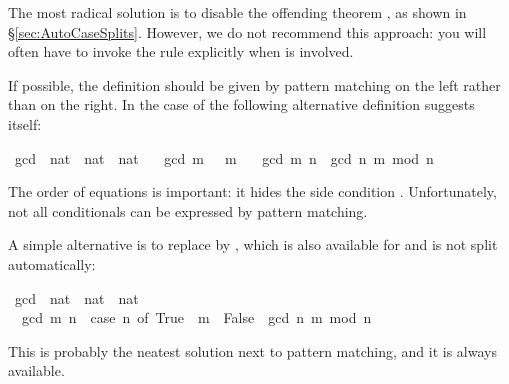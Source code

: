 \begin{isabellebody}
\begin{isamarkuptext}
The most radical solution is to disable the offending theorem
,
as shown in \S\ref{sec:AutoCaseSplits}.  However, we do not recommend this
approach: you will often have to invoke the rule explicitly when
 is involved.

If possible, the definition should be given by pattern matching on the left
rather than  on the right. In the case of  the
following alternative definition suggests itself:%
\end{isamarkuptext}%
\isamarkuptrue%
\isamarkupfalse%
\ gcd{}\ {\isacharcolon}{\isacharcolon}\ {\isachardoublequoteopen}nat\ {\isasymRightarrow}\ nat\ {\isasymRightarrow}\ nat{\isachardoublequoteclose}\ \isanewline
\ \ {\isachardoublequoteopen}gcd{}\ m\ {}\ {\isacharequal}\ m{\isachardoublequoteclose}\ {\isacharbar}\isanewline
\ \ {\isachardoublequoteopen}gcd{}\ m\ n\ {\isacharequal}\ gcd{}\ n\ {\isacharparenleft}m\ mod\ n{\isacharparenright}{\isachardoublequoteclose}%
\begin{isamarkuptext}%
\noindent
The order of equations is important: it hides the side condition
.  Unfortunately, not all conditionals can be
expressed by pattern matching.

A simple alternative is to replace  by , 
which is also available for  and is not split automatically:%
\end{isamarkuptext}%
\isamarkuptrue%
\isamarkupfalse%
\ gcd{}\ {\isacharcolon}{\isacharcolon}\ {\isachardoublequoteopen}nat\ {\isasymRightarrow}\ nat\ {\isasymRightarrow}\ nat{\isachardoublequoteclose}\ \isanewline
\ \ {\isachardoublequoteopen}gcd{}\ m\ n\ {\isacharequal}\ {\isacharparenleft}case\ n{\isacharequal}{}\ of\ True\ {\isasymRightarrow}\ m\ {\isacharbar}\ False\ {\isasymRightarrow}\ gcd{}\ n\ {\isacharparenleft}m\ mod\ n{\isacharparenright}{\isacharparenright}{\isachardoublequoteclose}%
\begin{isamarkuptext}%
\noindent
This is probably the neatest solution next to pattern matching, and it is
always available.


\end{isamarkuptext}
\end{isabellebody}
